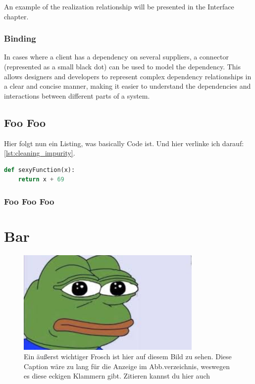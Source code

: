 \documentclass[
	12pt,
    a4paper,
    egregdoesnotlikesansseriftitles, %
    toc=chapterentrywithdots,
    oneside, openany,
    titlepage,
    parskip=half,
    headings=normal,  %
    listof=totoc,
    bibliography=totoc,
    index=totoc,
    captions=tableheading,  %
    listof=flat,
    numbers=noenddot, %
    final]
    {scrbook}
\begin{document}
An example of the realization relationship will be presented in the Interface chapter.



\subsection{Binding}


In cases where a client has a dependency on several suppliers, a connector (represented as a small black dot) can be used to model the dependency. This allows designers and developers to represent complex dependency relationships in a clear and concise manner, making it easier to understand the dependencies and interactions between different parts of a system.


\section{Foo Foo}
Hier folgt nun ein Listing, was basically Code ist. Und hier verlinke ich darauf: \autoref{lst:cleaning_impurity}.

\begin{lstlisting}[language=Python,caption={Pythonbeispiel nach Albrecht et al. \cite{albrecht_blueprints_2020}},captionpos=b,label={lst:cleaning_impurity}]
def sexyFunction(x):
	return x + 69
\end{lstlisting}	

\subsection{Foo Foo Foo}
\blindtext

\chapter{Bar}
\blindtext
\begin{figure}[h]
	\centering
	\includegraphics[width=0.8\textwidth]{figures/pepe-example.png}
	\caption[Kürzerer Text für Abb.verzeichnis]{Ein äußerst wichtiger Frosch ist hier auf diesem Bild zu sehen. Diese Caption wäre zu lang für die Anzeige im Abb.verzeichnis, weswegen es diese eckigen Klammern gibt. Zitieren kannst du hier auch \cite{albrecht_blueprints_2020}}
	\label{fig:pepe_der_frosch} %
\end{figure}
\blindtext
\end{document}
